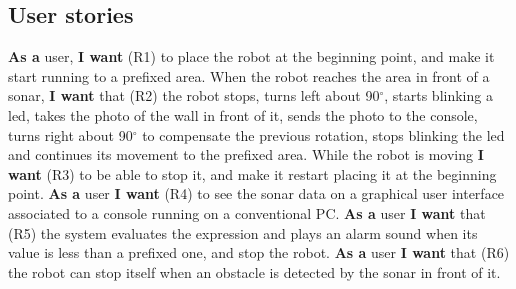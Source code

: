 \subsection{User stories}
\textbf{As a} user, \textbf{I want} (R1) to place the robot at the beginning point, and make it start running to a prefixed area. When the robot reaches the area in front of a sonar, \textbf{I want} that (R2) the robot stops, turns left about 90$^\circ$, starts blinking a led, takes the photo of the wall in front of it, sends the photo to the console, turns right about 90$^\circ$ to compensate the previous rotation, stops blinking the led and continues its movement to the prefixed area. While the robot is moving \textbf{I want} (R3) to be able to stop it, and make it restart placing it at the beginning point. \textbf{As a} user \textbf{I want} (R4) to see the sonar data on a graphical user interface associated to a console running on a conventional PC. \textbf{As a} user \textbf{I want} that (R5) the system evaluates the expression and plays an alarm sound when its value is less than a prefixed one, and stop the robot. \textbf{As a} user \textbf{I want} that (R6) the robot can stop itself when an obstacle is detected by the sonar in front of it.